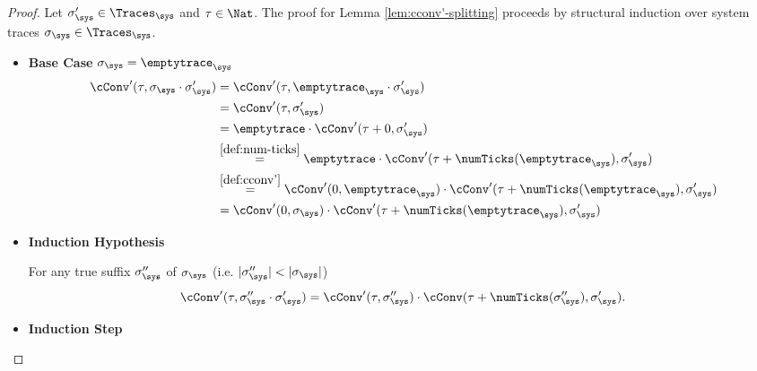 \begin{proof}
    \label{proof:cconv'-splitting}
    Let $\sigma_\sys' \in \Traces_\sys$ and $\tau \in \Nat$.
    The proof for Lemma \ref{lem:cconv'-splitting} proceeds
    by structural induction over system traces $\sigma_\sys \in \Traces_\sys$.
    \begin{itemize}
        \item \textbf{Base Case} $\sigma_\sys = \emptytrace_\sys$
        \begin{align*}
            \cConv'(\tau, \sigma_\sys \cdot \sigma_\sys')
            &=  \cConv'(\tau, \emptytrace_\sys \cdot \sigma_\sys') \\
            &=  \cConv'(\tau, \sigma_\sys') \\
            &=  \emptytrace \cdot \cConv'(\tau + 0, \sigma_\sys') \\
            &\stackrel{\ref{def:num-ticks}}{=} 
                \emptytrace \cdot
                \cConv'(\tau + \numTicks(\emptytrace_\sys), \sigma_\sys') \\
            &\stackrel{\ref{def:cconv'}}{=} 
                \cConv'(0, \emptytrace_\sys) \cdot
                \cConv'(\tau + \numTicks(\emptytrace_\sys), \sigma_\sys') \\
            &= \cConv'(0, \sigma_\sys) \cdot
                \cConv'(\tau + \numTicks(\emptytrace_\sys), \sigma_\sys')
        \end{align*}
        \item \textbf{Induction Hypothesis}

        For any true suffix $\sigma_\sys''$ of $\sigma_\sys$ 
        (i.e. $|\sigma_\sys''| < |\sigma_\sys|$)
        $$
        \cConv'(\tau, \sigma_\sys'' \cdot \sigma_\sys')
        = \cConv'(\tau, \sigma_\sys'') \cdot
        \cConv(\tau + \numTicks(\sigma_\sys''), \sigma_\sys').
        $$

        \item \textbf{Induction Step}


\end{itemize}
\end{proof}

